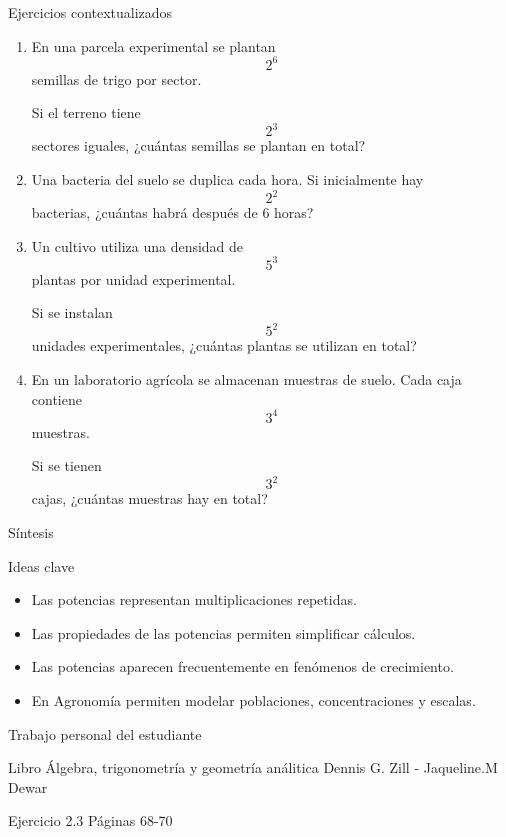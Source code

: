 \documentclass[aspectratio=169,10pt,handout]{beamer}
\begin{document}
	\begin{frame}{Ejercicios contextualizados}
		\begin{enumerate}
			\item En una parcela experimental se plantan
			\[
			2^6
			\]
			semillas de trigo por sector.
			
			Si el terreno tiene
			\[
			2^3
			\]
			sectores iguales, ¿cuántas semillas se plantan en total?
			
			\pause
			
			\item Una bacteria del suelo se duplica cada hora. Si inicialmente hay
			\[
			2^2
			\]
			bacterias, ¿cuántas habrá después de 6 horas?
			
			\pause
			
			\item Un cultivo utiliza una densidad de
			\[
			5^3
			\]
			plantas por unidad experimental.
			
			Si se instalan
			\[
			5^2
			\]
			unidades experimentales, ¿cuántas plantas se utilizan en total?
			
			\pause
			
			\item En un laboratorio agrícola se almacenan muestras de suelo. Cada caja contiene
			\[
			3^4
			\]
			muestras.
			
			Si se tienen
			\[
			3^2
			\]
			cajas, ¿cuántas muestras hay en total?
		\end{enumerate}
	\end{frame}
	
	\begin{frame}{Síntesis}
		\begin{block}{Ideas clave}
			\begin{itemize}
				\item Las potencias representan multiplicaciones repetidas.
				\item Las propiedades de las potencias permiten simplificar cálculos.
				\item Las potencias aparecen frecuentemente en fenómenos de crecimiento.
				\item En Agronomía permiten modelar poblaciones, concentraciones y escalas.
			\end{itemize}
		\end{block}
	\end{frame}
	
		\begin{frame}{Trabajo personal del estudiante}
		
		\centering
		
		\vspace{0.3cm}
		
		Libro Álgebra, trigonometría y geometría análitica
		Dennis G. Zill - Jaqueline.M Dewar
		
		\medskip
		
		Ejercicio 2.3 Páginas 68-70	
		
	\end{frame}	
	
	
\end{document}
